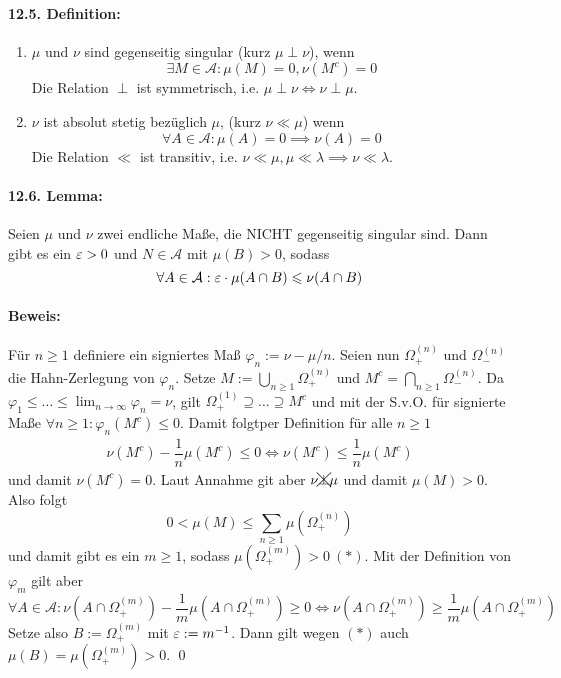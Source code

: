      \paragraph{12.5. Definition:} 
     \begin{enumerate}[label=(\roman*)]
         \item $\mu$ und $\nu$ sind gegenseitig singular (kurz $\mu\perp\nu$), wenn
         $$\exists M\in\mathcal{A}:\mu(M)=0, \nu(M^c)=0$$
         Die Relation $\perp$ ist symmetrisch, i.e. $\mu\perp\nu\iff\nu\perp\mu$.
         \item $\nu$ ist absolut stetig bez\"uglich $\mu$, (kurz $\nu\ll\mu$) wenn
         $$\forall A\in\mathcal{A}: \mu(A)=0\implies\nu(A)=0$$
         Die Relation $\ll$ ist transitiv, i.e. $\nu\ll\mu,\mu\ll\lambda\implies\nu\ll\lambda$.
     \end{enumerate}
     
     \paragraph{12.6. Lemma:} Seien $\mu$ und $\nu$ zwei endliche Ma\ss{}e, die NICHT gegenseitig singular sind. Dann gibt es ein $\varepsilon>0$ und $N\in\mathcal{A}$ mit $\mu(B)>0$, sodass
     $$\forall A\in\mathcal{A}:\varepsilon\cdot\mu(A\cap B)\leqslant\nu(A\cap B)$$
     
     \paragraph{Beweis: }F\"ur $n\geq1$ definiere ein signiertes Ma\ss{} $\varphi_n:=\nu-\mu/n$. Seien nun $\Omega^{(n)}_+$ und $\Omega^{(n)}_-$ die Hahn-Zerlegung von $\varphi_n$. Setze $M:=\bigcup_{n\geq1}\Omega^{(n)}_+$ und $M^c=\bigcap_{n\geq1}\Omega^{(n)}_-$. Da $\varphi_1\leq\hdots\leq\displaystyle\lim_{n\to\infty}\varphi_n=\nu$, gilt $\Omega^{(1)}_+\supseteq\hdots\supseteq M^c$ und mit der S.v.O. f\"ur signierte Ma\ss{}e $\forall n\geq1:\varphi_n(M^c)\leq0$. \newline Damit folgtper Definition f\"ur alle $n\geq1$
     \begin{align*}
         \nu(M^c)-\dfrac{1}{n}\mu(M^c)\leq0 \iff \nu(M^c)\leq\dfrac{1}{n}\mu(M^c)
     \end{align*}
     und damit $\nu(M^c)=0$. Laut Annahme git aber $\nu\xcancel{\perp}\mu$ und damit $\mu(M)>0$. Also folgt
     $$0<\mu(M)\leq\sum_{n\geq1}\mu(\Omega^{(n)}_+)$$
     und damit gibt es ein $m\geq1$, sodass $\mu(\Omega^{(m)}_+)>0\ (*)$. Mit der Definition von $\varphi_m$ gilt aber
     $$\forall A\in\mathcal{A}:\nu(A\cap \Omega^{(m)}_+)-\dfrac{1}{m}\mu(A\cap \Omega^{(m)}_+)\geq0\iff\nu(A\cap \Omega^{(m)}_+)\geq\dfrac{1}{m}\mu(A\cap \Omega^{(m)}_+)$$
     Setze also $B:=\Omega^{(m)}_+$ mit $\varepsilon:=m^{-1}$. Dann gilt wegen $(*)$ auch $\mu(B)=\mu(\Omega^{(m)}_+)>0$. \qed
     
